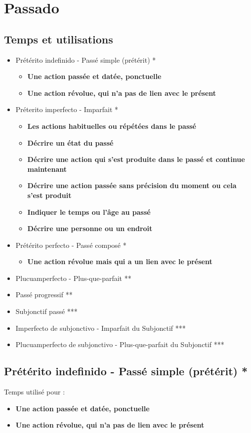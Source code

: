 \chapter{Passado}
\section{Temps et utilisations}
\begin{itemize}
    \item Prétérito indefinido - Passé simple (prétérit) *
    \begin{itemize}
        \item \textbf{Une action passée et datée, ponctuelle}
        \item \textbf{Une action révolue, qui n'a pas de lien avec le présent}
    \end{itemize}
    \item Préterito imperfecto - Imparfait *
    \begin{itemize}
        \item \textbf{Les actions habituelles ou répétées dans le passé}
        \item \textbf{Décrire un état du passé}
        \item \textbf{Décrire une action qui s'est produite dans le passé et continue maintenant}
        \item \textbf{Décrire une action passée sans précision du moment ou cela s'est produit}
        \item \textbf{Indiquer le temps ou l'âge au passé}
        \item \textbf{Décrire une personne ou un endroit}
    \end{itemize}
    \item Prétérito perfecto - Passé composé *
    \begin{itemize}
        \item \textbf{Une action révolue mais qui a un lien avec le présent}
    \end{itemize}
    \item Plucuamperfecto - Plus-que-parfait **
    \item Passé progressif **
    \item Subjonctif passé ***
    \item Imperfecto de subjonctivo - Imparfait du Subjonctif ***
    \item Plucuamperfecto de subjonctivo - Plus-que-parfait du Subjonctif ***
\end{itemize}
\newpage
\section{Prétérito indefinido - Passé simple (prétérit) *}
Temps utilisé pour : 
\begin{itemize}
    \item \textbf{Une action passée et datée, ponctuelle}
    \item \textbf{Une action révolue, qui n'a pas de lien avec le présent}
\end{itemize}
